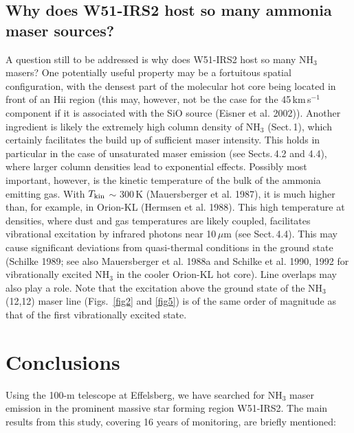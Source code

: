 \documentclass[oldversion]{aa}
\begin{document}
\subsection{Why does W51-IRS2 host so many ammonia maser sources?}

A question still to be addressed is why does W51-IRS2 host so 
many NH$_3$ masers? One potentially useful property may be a fortuitous
spatial configuration, with the densest part of the molecular hot core 
being located in front of an H{\sc ii} region (this may, however, 
not be the case for the 45\,km\,s$^{-1}$ component if it is 
associated with the SiO source (Eisner et al. 2002)). Another 
ingredient is likely the extremely high column density of NH$_3$ 
(Sect.\,1), which certainly facilitates the build up of sufficient
maser intensity. This holds in particular in the case of unsaturated maser 
emission (see Sects.\,4.2 and 4.4), where larger column densities 
lead to exponential effects. Possibly most important, however, is 
the kinetic temperature of the bulk of the ammonia emitting gas. With 
$T_{\rm kin}$ $\sim$ 300\,K (Mauersberger et al. 1987), it is much 
higher than, for example, in Orion-KL (Hermsen et al. 1988). This high 
temperature at densities, where dust and gas temperatures are likely
coupled, facilitates vibrational excitation by infrared photons near
10\,$\mu$m (see Sect.\,4.4). This may cause significant deviations 
from quasi-thermal conditions in the ground state (Schilke 1989; see 
also Mauersberger et al. 1988a and Schilke et al. 1990, 1992 for 
vibrationally excited NH$_3$ in the cooler Orion-KL hot core). Line 
overlaps may also play a role. Note that the excitation above the ground 
state of the NH$_3$ (12,12) maser line (Figs.~\ref{fig2} and \ref{fig5}) 
is of the same order of magnitude as that of the first vibrationally 
excited state. 


\section{Conclusions}

Using the 100-m telescope at Effelsberg, we have searched for NH$_3$
maser emission in the prominent massive star forming region W51-IRS2.
The main results from this study, covering 16 years of monitoring, 
are briefly mentioned: 
\end{document}
